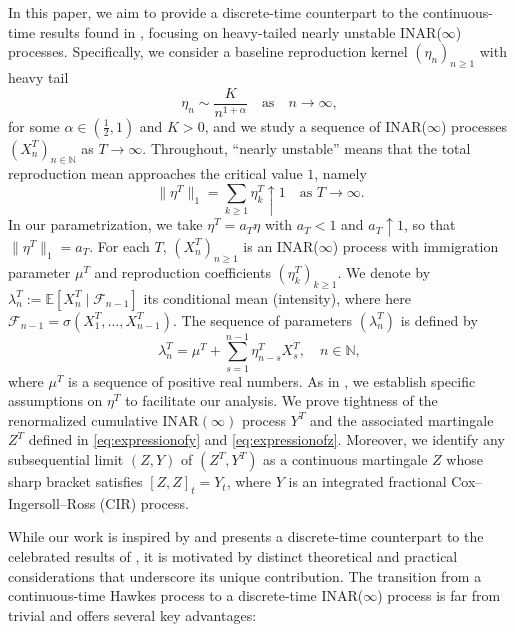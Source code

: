 \documentclass[letterpaper]{article}
\numberwithin{equation}{section}
\theoremstyle{definition}
\theoremstyle{remark}
\begin{document}
In this paper, we aim to provide a discrete-time counterpart to the continuous-time results found in \cite{jaisson2016rough}, focusing on heavy-tailed nearly unstable INAR($\infty$) processes. Specifically, we consider a baseline reproduction kernel $(\eta_n)_{n\ge1}$ with heavy tail
\[
  \eta_n \sim \frac{K}{n^{1+\alpha}} \quad \text{as} \quad n \to \infty,
\]
for some $\alpha \in \left(\frac{1}{2}, 1\right)$ and $K>0$, and we study a sequence of INAR($\infty$) processes $(X_n^T)_{n\in\mathbb{N}}$ as $T\to\infty$.
{Throughout, ``nearly unstable'' means that the total reproduction mean approaches the critical value $1$, namely
\begin{equation}\label{eq:nearly_unstable}
  \|\eta^T\|_1=\sum_{k\ge1}\eta_k^T \uparrow 1 \quad \text{as } T\to\infty.
\end{equation}
In our parametrization, we take $\eta^T=a_T\eta$ with $a_T<1$ and $a_T\uparrow 1$, so that $\|\eta^T\|_1=a_T$.}
{For each $T$, $(X_n^T)_{n\ge1}$ is an INAR($\infty$) process with immigration parameter $\mu^T$ and reproduction coefficients $(\eta_k^T)_{k\ge1}$. We denote by $\lambda_n^T:=\mathbb E[X_n^T\mid\mathcal{F}_{n-1}]$ its conditional mean (intensity), where here $\mathcal{F}_{n-1}=\sigma(X_1^T,\dots,X_{n-1}^T)$.}
The sequence of parameters $(\lambda_n^T)$ is defined by
\begin{equation}\label{eq:lambdaTexpression}
  \lambda_n^T = \mu^T + \sum_{s=1}^{n-1} \eta_{n-s}^T X_s^T, \quad n \in \mathbb{N},
\end{equation}
where $\mu^T$ is a sequence of positive real numbers. As in \cite{jaisson2016rough}, we establish specific assumptions on $\eta^T$ to facilitate our analysis. We prove tightness of the renormalized cumulative INAR$(\infty)$ process $Y^T$ and the associated martingale $Z^T$ defined in \eqref{eq:expressionofy} and \eqref{eq:expressionofz}. Moreover, we identify any subsequential limit $(Z,Y)$ of $(Z^T,Y^T)$ as a continuous martingale $Z$ whose sharp bracket satisfies $[Z,Z]_t = Y_t$, where $Y$ is an integrated fractional Cox--Ingersoll--Ross (CIR) process.

While our work is inspired by and presents a discrete-time counterpart to the celebrated results of \cite{jaisson2016rough}, it is motivated by distinct theoretical and practical considerations that underscore its unique contribution. The transition from a continuous-time Hawkes process to a discrete-time INAR($\infty$) process is far from trivial and offers several key advantages:
\end{document}
